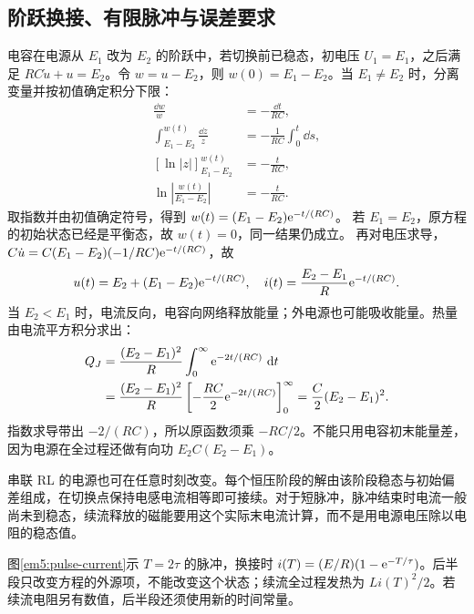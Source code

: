 \subsection{阶跃换接、有限脉冲与误差要求}



电容在电源从 $E_1$ 改为 $E_2$ 的阶跃中，若切换前已稳态，初电压 $U_1=E_1$，之后满足 $RC\dot u+u=E_2$。令 $w=u-E_2$，则 $w(0)=E_1-E_2$。当 $E_1\ne E_2$ 时，分离变量并按初值确定积分下限：
\begin{align*}
\frac{\dd w}{w}&=-\frac{\dd t}{RC},\\
\int_{E_1-E_2}^{w(t)}\frac{\dd z}{z}
&=-\frac1{RC}\int_0^t\dd s,\\
\left[\ln|z|\right]_{E_1-E_2}^{w(t)}
&=-\frac{t}{RC},\\
\ln\left|\frac{w(t)}{E_1-E_2}\right|
&=-\frac{t}{RC}.
\end{align*}
取指数并由初值确定符号，得到 $w(t)=(E_1-E_2)\mathrm e^{-t/(RC)}$。
若 $E_1=E_2$，原方程的初始状态已经是平衡态，故 $w(t)=0$，同一结果仍成立。
再对电压求导，
$C\dot u=C(E_1-E_2)(-1/RC)\mathrm e^{-t/(RC)}$，故
\[u(t)=E_2+(E_1-E_2)\mathrm e^{-t/(RC)},\quad i(t)=\frac{E_2-E_1}{R}\mathrm e^{-t/(RC)}.\]
当 $E_2<E_1$ 时，电流反向，电容向网络释放能量；外电源也可能吸收能量。热量由电流平方积分求出：
\begin{align*}
Q_J&=\frac{(E_2-E_1)^2}{R}\int_0^\infty\mathrm e^{-2t/(RC)}\,\mathop{}\!\mathrm d t\\
&=\frac{(E_2-E_1)^2}{R}
\left[-\frac{RC}{2}\mathrm e^{-2t/(RC)}\right]_0^\infty
=\frac C2(E_2-E_1)^2.
\end{align*}
指数求导带出 $-2/(RC)$，所以原函数须乘 $-RC/2$。不能只用电容初末能量差，因为电源在全过程还做有向功 $E_2C(E_2-E_1)$。

串联 RL 的电源也可在任意时刻改变。每个恒压阶段的解由该阶段稳态与初始偏差组成，在切换点保持电感电流相等即可接续。对于短脉冲，脉冲结束时电流一般尚未到稳态，续流释放的磁能要用这个实际末电流计算，而不是用电源电压除以电阻的稳态值。

图\ref{em5:pulse-current}示 $T=2\tau$ 的脉冲，换接时 $i(T)=(E/R)(1-\mathrm e^{-T/\tau})$。后半段只改变方程的外源项，不能改变这个状态；续流全过程发热为 $Li(T)^2/2$。若续流电阻另有数值，后半段还须使用新的时间常量。


